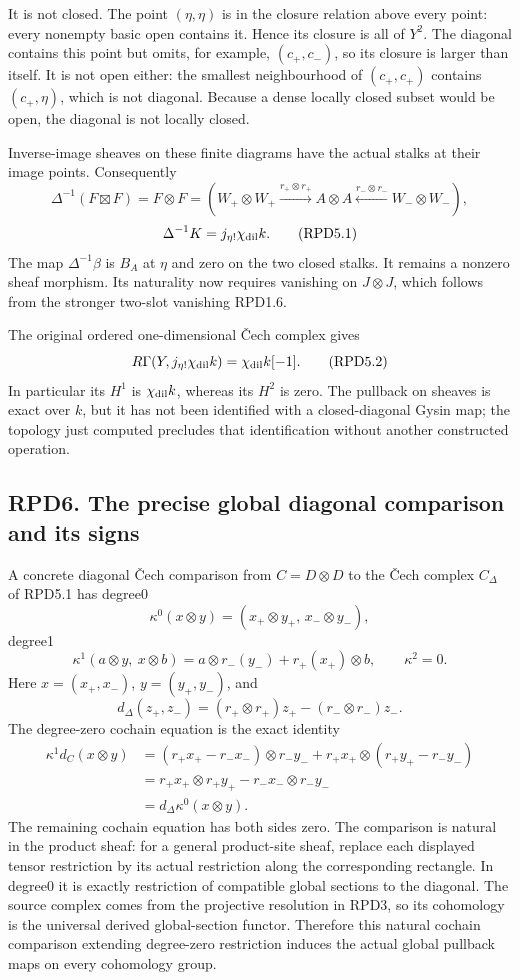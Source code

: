 It is not closed. The point \((\eta,\eta)\) is in the closure relation
above every point: every nonempty basic open contains it. Hence its
closure is all of \(Y^2\). The diagonal contains this point but omits,
for example, \((c_+,c_-)\), so its closure is larger than itself. It is
not open either: the smallest neighbourhood of \((c_+,c_+)\) contains
\((c_+,\eta)\), which is not diagonal. Because a dense locally closed
subset would be open, the diagonal is not locally closed.

Inverse-image sheaves on these finite diagrams have the actual stalks at
their image points. Consequently \[
\Delta^{-1}(F\boxtimes F)=F\otimes F
=(W_+\otimes W_+\xrightarrow{r_+\otimes r_+}A\otimes A
\xleftarrow{r_-\otimes r_-}W_-\otimes W_-),
\] \[
\Delta^{-1}K=j_{\eta!}\chi_{\rm dil}k.
\tag{RPD5.1}
\] The map \(\Delta^{-1}\beta\) is \(B_A\) at \(\eta\) and zero on the
two closed stalks. It remains a nonzero sheaf morphism. Its naturality
now requires vanishing on \(J\otimes J\), which follows from the
stronger two-slot vanishing RPD1.6.

The original ordered one-dimensional Čech complex gives \[
R\Gamma(Y,j_{\eta!}\chi_{\rm dil}k)
=\chi_{\rm dil}k[-1].
\tag{RPD5.2}
\] In particular its \(H^1\) is \(\chi_{\rm dil}k\), whereas its \(H^2\)
is zero. The pullback on sheaves is exact over \(k\), but it has not
been identified with a closed-diagonal Gysin map; the topology just
computed precludes that identification without another constructed
operation.

\subsection{RPD6. The precise global diagonal comparison and its
signs}\label{rpd6.-the-precise-global-diagonal-comparison-and-its-signs}

A concrete diagonal Čech comparison from \(C=D\otimes D\) to the Čech
complex \(C_\Delta\) of RPD5.1 has degree0 \[
\kappa^0(x\otimes y)=(x_+\otimes y_+,\,x_-\otimes y_-),
\] degree1 \[
\kappa^1(a\otimes y,\ x\otimes b)
=a\otimes r_-(y_-)+r_+(x_+)\otimes b,
\qquad \kappa^2=0.
\tag{RPD6.1}
\] Here \(x=(x_+,x_-)\), \(y=(y_+,y_-)\), and \[
d_\Delta(z_+,z_-)
=(r_+\otimes r_+)z_+-(r_-\otimes r_-)z_-.
\] The degree-zero cochain equation is the exact identity \[
\begin{aligned}
\kappa^1d_C(x\otimes y)
&=(r_+x_+-r_-x_-)\otimes r_-y_-
+r_+x_+\otimes(r_+y_+-r_-y_-)\\
&=r_+x_+\otimes r_+y_+-r_-x_-\otimes r_-y_-\\
&=d_\Delta\kappa^0(x\otimes y).
\end{aligned}
\tag{RPD6.2}
\] The remaining cochain equation has both sides zero. The comparison is
natural in the product sheaf: for a general product-site sheaf, replace
each displayed tensor restriction by its actual restriction along the
corresponding rectangle. In degree0 it is exactly restriction of
compatible global sections to the diagonal. The source complex comes
from the projective resolution in RPD3, so its cohomology is the
universal derived global-section functor. Therefore this natural cochain
comparison extending degree-zero restriction induces the actual global
pullback maps on every cohomology group.

